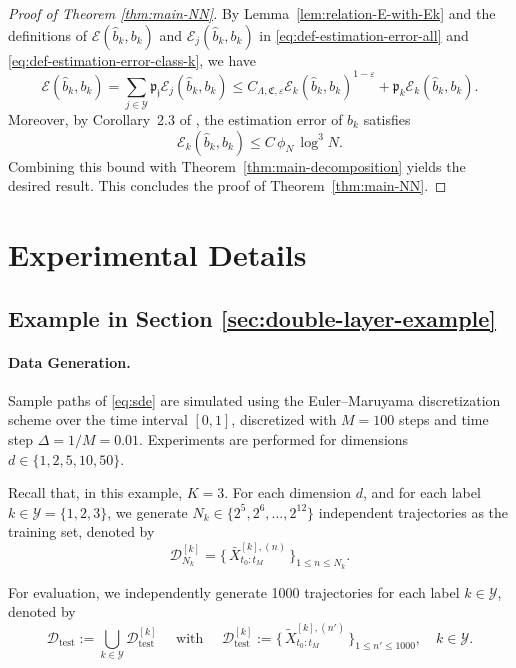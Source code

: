 \documentclass{article}
\theoremstyle{plain}
\theoremstyle{definition}
\theoremstyle{remark}
\newcommand{\calY}{\mathcal{Y}}
\begin{document}
\begin{proof}[Proof of Theorem \ref{thm:main-NN}]

By Lemma~\ref{lem:relation-E-with-Ek} and the definitions of
$\mathcal{E}(\widehat b_k,b_k)$ and $\mathcal{E}_j(\widehat b_k,b_k)$ in
\eqref{eq:def-estimation-error-all} and
\eqref{eq:def-estimation-error-class-k}, we have
\[\mathcal{E}(\widehat b_k, b_k)=\sum_{j\in\calY}\mathfrak{p_j}\mathcal{E}_j(\widehat b_k, b_k)\leq C_{\Lambda, \mathfrak{C}, \varepsilon}\mathcal{E}_k(\widehat b_k,b_k)^{1-\varepsilon}+\mathfrak{p}_k \mathcal{E}_k(\widehat b_k,b_k).\]
Moreover, by Corollary~2.3 of \citet{zhao2025drift}, the estimation error of 
$b_k$ satisfies  
\[
\mathcal{E}_k(\widehat b_k,b_k)
\le
C\,\phi_N\,\log^3 N .
\]
Combining this bound with Theorem~\ref{thm:main-decomposition} yields the
desired result. This concludes the proof of Theorem~\ref{thm:main-NN}.
\end{proof}







\section{Experimental Details}\label{app:Experimental-Details}

\subsection{Example in Section \ref{sec:double-layer-example}}\label{app:Experimental-3.1}

\paragraph{Data Generation.}
Sample paths of \eqref{eq:sde} are simulated using the Euler--Maruyama discretization scheme over the time interval $[0,1]$, discretized with $M = 100$ steps and time step $\Delta = 1/M = 0.01$. Experiments are performed for dimensions $d \in \{1,2,5,10,50\}$.

Recall that, in this example, $K=3$. For each dimension $d$, and for each label $k\in\calY=\{1,2,3\}$, we generate $N_k\in \{2^5,2^6,\dots,2^{12}\}$ independent trajectories as the training set, denoted by  %
\[
\mathcal{D}^{[k]}_{N_k} = \bigl\{\, \bar{X}^{[k],(n)}_{t_0:t_M} \,\bigr\}_{1\leq n\leq N_k}. 
\]

For evaluation, we independently generate 1000 trajectories for each label $k\in\calY$, denoted by 
\[
\mathcal{D}_{\mathrm{test}} := \bigcup_{k \in \mathcal{Y}} \mathcal{D}^{[k]}_{\mathrm{test}} \quad \text{ with }\quad
\mathcal{D}^{[k]}_{\mathrm{test}} := \bigl\{\, \tilde{X}^{[k],(n')}_{t_0:t_M}  \,\bigr\}_{1\leq n' \leq 1000},\quad k \in \mathcal{Y}.
\]
\end{document}
